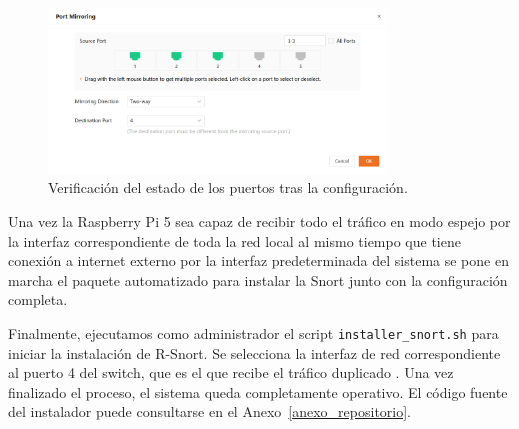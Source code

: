 \documentclass[11pt,a4paper,twoside]{report}
\begin{document}
\begin{figure}[H]
	\centering
	\includegraphics[width=0.8\textwidth]{pruebas_config/9-asignacion_port.png}
	\caption{Verificación del estado de los puertos tras la configuración.}
\end{figure}

Una vez la Raspberry Pi 5 sea capaz de recibir todo el tráfico en modo espejo por la interfaz correspondiente de toda la red local al mismo tiempo que tiene conexión a internet externo por la interfaz predeterminada del sistema se pone en marcha el paquete automatizado para instalar la Snort junto con la configuración completa.\newline

Finalmente, ejecutamos como administrador el script \texttt{installer\_snort.sh} para iniciar la instalación de R-Snort. Se selecciona la interfaz de red correspondiente al puerto 4 del switch, que es el que recibe el tráfico duplicado \cite{bartman2016snort}. Una vez finalizado el proceso, el sistema queda completamente operativo. El código fuente del instalador puede consultarse en el Anexo~\ref{anexo_repositorio}.
\end{document}
